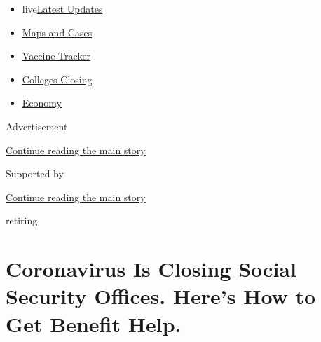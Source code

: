 \begin{itemize}
\tightlist
\item
  live\href{https://www.nytimes3xbfgragh.onion/2020/08/21/world/covid-19-coronavirus.html?name=styln-coronavirus-markets\&region=TOP_BANNER\&variant=undefined\&block=storyline_menu_recirc\&action=click\&pgtype=Article\&impression_id=c4c84341-e3a1-11ea-b662-63e62169161f}{Latest
  Updates}
\item
  \href{https://www.nytimes3xbfgragh.onion/interactive/2020/us/coronavirus-us-cases.html?name=styln-coronavirus-markets\&region=TOP_BANNER\&variant=undefined\&block=storyline_menu_recirc\&action=click\&pgtype=Article\&impression_id=c4c86a50-e3a1-11ea-b662-63e62169161f}{Maps
  and Cases}
\item
  \href{https://www.nytimes3xbfgragh.onion/interactive/2020/science/coronavirus-vaccine-tracker.html?name=styln-coronavirus-markets\&region=TOP_BANNER\&variant=undefined\&block=storyline_menu_recirc\&action=click\&pgtype=Article\&impression_id=c4c86a51-e3a1-11ea-b662-63e62169161f}{Vaccine
  Tracker}
\item
  \href{https://www.nytimes3xbfgragh.onion/2020/08/19/us/colleges-closing-covid.html?name=styln-coronavirus-markets\&region=TOP_BANNER\&variant=undefined\&block=storyline_menu_recirc\&action=click\&pgtype=Article\&impression_id=c4c86a52-e3a1-11ea-b662-63e62169161f}{Colleges
  Closing}
\item
  \href{https://www.nytimes3xbfgragh.onion/live/2020/08/20/business/stock-market-today-coronavirus?name=styln-coronavirus-markets\&region=TOP_BANNER\&variant=undefined\&block=storyline_menu_recirc\&action=click\&pgtype=Article\&impression_id=c4c86a53-e3a1-11ea-b662-63e62169161f}{Economy}
\end{itemize}

Advertisement

\protect\hyperlink{after-top}{Continue reading the main story}

Supported by

\protect\hyperlink{after-sponsor}{Continue reading the main story}

retiring

\hypertarget{coronavirus-is-closing-social-security-offices-heres-how-to-get-benefit-help}{%
\section{Coronavirus Is Closing Social Security Offices. Here's How to
Get Benefit
Help.}\label{coronavirus-is-closing-social-security-offices-heres-how-to-get-benefit-help}}

